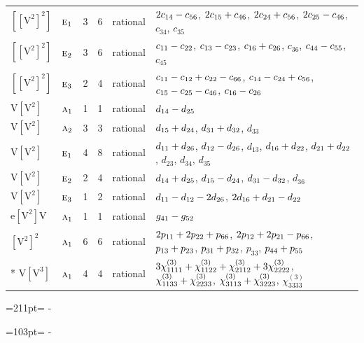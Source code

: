 \documentclass[10pt,a4paper]{article}
\newcommand{\needspace}[1]{\par\penalty-100\begingroup\dimen0=#1\relax\dimen2=\pagegoal
  \advance\dimen2-\pagetotal\ifdim\dimen0>\dimen2\relax\ifdim\dimen2>0pt\vfil\break\fi\fi
  \endgroup}
\numberwithin{equation}{section}
\newcommand{\irr}[1]{\text{\normalfont\scshape #1}}
\newcommand{\jahn}[1]{\mathrm{#1}}
\newlength{\fillwidth}\newlength{\cellwidth}\newlength{\colwidth}
\newcommand{\signbreak}{\penalty100\relax}
\begin{document}
{\begin{longtable}{@{}llrrl>{\RaggedRight\arraybackslash}p{\fillwidth}@{}}
$\jahn{[[V^{2}]^{2}]}$ & $\irr{e}_{1}$ & 3 & 6 & rational & $2c_{14} -\signbreak c_{56}$, $2c_{15} +\signbreak c_{46}$, $2c_{24} +\signbreak c_{56}$, $2c_{25} -\signbreak c_{46}$, $c_{34}$, $c_{35}$\\
$\jahn{[[V^{2}]^{2}]}$ & $\irr{e}_{2}$ & 3 & 6 & rational & $c_{11} -\signbreak c_{22}$, $c_{13} -\signbreak c_{23}$, $c_{16} +\signbreak c_{26}$, $c_{36}$, $c_{44} -\signbreak c_{55}$, $c_{45}$\\
$\jahn{[[V^{2}]^{2}]}$ & $\irr{e}_{3}$ & 2 & 4 & rational & $c_{11} -\signbreak c_{12} +\signbreak c_{22} -\signbreak c_{66}$, $c_{14} -\signbreak c_{24} +\signbreak c_{56}$, $c_{15} -\signbreak c_{25} -\signbreak c_{46}$, $c_{16} -\signbreak c_{26}$\\
$\jahn{V[V^{2}]}$ & $\irr{a}_{1}$ & 1 & 1 & rational & $d_{14} -\signbreak d_{25}$\\
$\jahn{V[V^{2}]}$ & $\irr{a}_{2}$ & 3 & 3 & rational & $d_{15} +\signbreak d_{24}$, $d_{31} +\signbreak d_{32}$, $d_{33}$\\
$\jahn{V[V^{2}]}$ & $\irr{e}_{1}$ & 4 & 8 & rational & $d_{11} +\signbreak d_{26}$, $d_{12} -\signbreak d_{26}$, $d_{13}$, $d_{16} +\signbreak d_{22}$, $d_{21} +\signbreak d_{22}$, $d_{23}$, $d_{34}$, $d_{35}$\\
$\jahn{V[V^{2}]}$ & $\irr{e}_{2}$ & 2 & 4 & rational & $d_{14} +\signbreak d_{25}$, $d_{15} -\signbreak d_{24}$, $d_{31} -\signbreak d_{32}$, $d_{36}$\\
$\jahn{V[V^{2}]}$ & $\irr{e}_{3}$ & 1 & 2 & rational & $d_{11} -\signbreak d_{12} -\signbreak 2d_{26}$, $2d_{16} +\signbreak d_{21} -\signbreak d_{22}$\\
$\jahn{e[V^{2}]V}$ & $\irr{a}_{1}$ & 1 & 1 & rational & $\mathnormal{g}_{41} -\signbreak \mathnormal{g}_{52}$\\
$\jahn{[V^{2}]^{2}}$ & $\irr{a}_{1}$ & 6 & 6 & rational & $2p_{11} +\signbreak 2p_{22} +\signbreak p_{66}$, $2p_{12} +\signbreak 2p_{21} -\signbreak p_{66}$, $p_{13} +\signbreak p_{23}$, $p_{31} +\signbreak p_{32}$, $p_{33}$, $p_{44} +\signbreak p_{55}$\\*
$\jahn{V[V^{3}]}$ & $\irr{a}_{1}$ & 4 & 4 & rational & $3\chi^{(3)}_{1111} +\signbreak \chi^{(3)}_{1122} +\signbreak \chi^{(3)}_{2112} +\signbreak 3\chi^{(3)}_{2222}$, $\chi^{(3)}_{1133} +\signbreak \chi^{(3)}_{2233}$, $\chi^{(3)}_{3113} +\signbreak \chi^{(3)}_{3223}$, $\chi^{(3)}_{3333}$\\
\bottomrule\end{longtable}}
\needspace{211pt}
\needspace{103pt}
\end{document}
